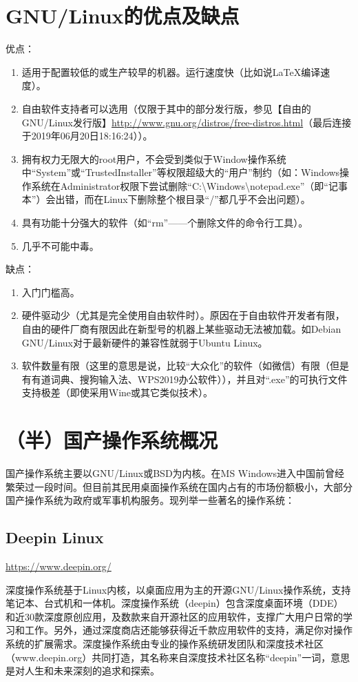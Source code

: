 \section{GNU/Linux的优点及缺点}
优点：
\begin{enumerate}
	\item  适用于配置较低的或生产较早的机器。运行速度快（比如说\LaTeX 编译速度）。\par
	\item 自由软件支持者可以选用（仅限于其中的部分发行版，参见【自由的GNU/Linux发行版】\url{http://www.gnu.org/distros/free-distros.html}（最后连接于2019年06月20日18:16:24））。\par
	\item 拥有权力无限大的root用户，不会受到类似于Window操作系统中“System”或“TrustedInstaller”等权限超级大的“用户”制约（如：Windows操作系统在Administrator权限下尝试删除“C:\textbackslash Windows\textbackslash notepad.exe”（即“记事本”）会出错，而在Linux下删除整个根目录“/”都几乎不会出问题）。\par
	\item 具有功能十分强大的软件（如“rm”——个删除文件的命令行工具）。
	\item 几乎不可能中毒。
\end{enumerate}
缺点：
\begin{enumerate}
	\item 入门门槛高。
	\item 硬件驱动少（尤其是完全使用自由软件时）。原因在于自由软件开发者有限，自由的硬件厂商有限因此在新型号的机器上某些驱动无法被加载。如Debian GNU/Linux对于最新硬件的兼容性就弱于Ubuntu Linux。
	\item 软件数量有限（这里的意思是说，比较“大众化”的软件（如微信）有限（但是有有道词典、搜狗输入法、WPS2019办公软件）），并且对“.exe”的可执行文件支持极差（即使采用Wine或其它类似技术）。	
\end{enumerate}
\section{（半）国产操作系统概况}
国产操作系统主要以GNU/Linux或BSD为内核。在MS Windows进入中国前曾经繁荣过一段时间。但目前其民用桌面操作系统在国内占有的市场份额极小，大部分国产操作系统为政府或军事机构服务。现列举一些著名的操作系统：
\subsection{Deepin Linux}
\url{https://www.deepin.org/}\par
\cite{deepininfo}深度操作系统基于Linux内核，以桌面应用为主的开源GNU/Linux操作系统，支持笔记本、台式机和一体机。深度操作系统（deepin）包含深度桌面环境（DDE）和近30款深度原创应用，及数款来自开源社区的应用软件，支撑广大用户日常的学习和工作。另外，通过深度商店还能够获得近千款应用软件的支持，满足你对操作系统的扩展需求。深度操作系统由专业的操作系统研发团队和深度技术社区（www.deepin.org）共同打造，其名称来自深度技术社区名称“deepin”一词，意思是对人生和未来深刻的追求和探索。
